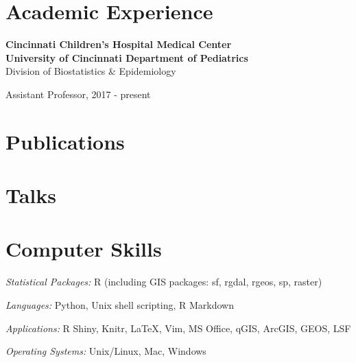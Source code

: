\documentclass[margin,line]{res}
\newenvironment{list1}{
  \begin{list}{\ding{113}}{%
      \setlength{\itemsep}{0in}
      \setlength{\parsep}{0in} \setlength{\parskip}{0in}
      \setlength{\topsep}{0in} \setlength{\partopsep}{0in}
      \setlength{\leftmargin}{0.17in}}}{\end{list}}
\newenvironment{list3}{
  \begin{list}{}{%
      \setlength{\itemsep}{0in}
      \setlength{\parsep}{0in} \setlength{\parskip}{0in}
      \setlength{\topsep}{0in} \setlength{\partopsep}{0in}
      \setlength{\leftmargin}{0in}}}{\end{list}}
\begin{document}
\begin{resume}
\section{\sc Academic Experience}

{\bf Cincinnati Children's Hospital Medical Center}\\
{\bf University of Cincinnati Department of Pediatrics}\\
Division of Biostatistics \& Epidemiology\\
\vspace*{-.1in}
\begin{list1}
    \item[] Assistant Professor, 2017 - present
\end{list1}



\section{\sc Publications}


\section{\sc Talks}


\section{\sc Computer Skills}

\begin{list3} \itemsep 4pt
\item[] \textit{Statistical Packages:}  R (including GIS packages: sf, rgdal, rgeos, sp, raster)
\item[] \textit{Languages:} Python, Unix shell scripting, R Markdown
\item[] \textit{Applications:} R Shiny, Knitr, \LaTeX, Vim, MS Office, qGIS, ArcGIS, GEOS, LSF
\item[] \textit{Operating Systems:}  Unix/Linux, Mac, Windows\\
\end{list3}


\end{resume}
\end{document}
